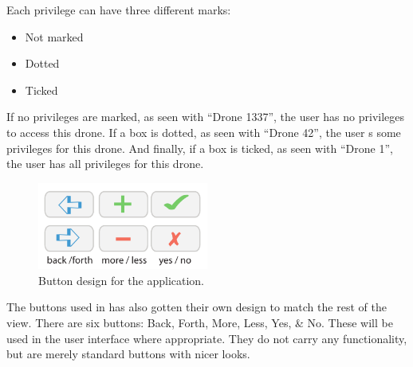 Each privilege can have three different marks:

\begin{itemize}
    \item Not marked
    \item Dotted
    \item Ticked
\end{itemize}

If no privileges are marked, as seen with ``Drone 1337'', the user has no privileges to access this drone.
If a box is dotted, as seen with ``Drone 42'', the user s some privileges for this drone.
And finally, if a box is ticked, as seen with ``Drone 1'', the user has all privileges for this drone.

\begin{figure}[htb]
    \centering
    \includegraphics[width=0.5\textwidth]{gfx/button.pdf}
    \caption{Button design for the application.}
    \label{fig:button_design}
\end{figure}

The buttons used in \projectname{} has also gotten their own design to match the rest of the view.
There are six buttons:
Back, Forth, More, Less, Yes, \& No.
These will be used in the user interface where appropriate.
They do not carry any functionality, but are merely standard buttons with nicer looks.
